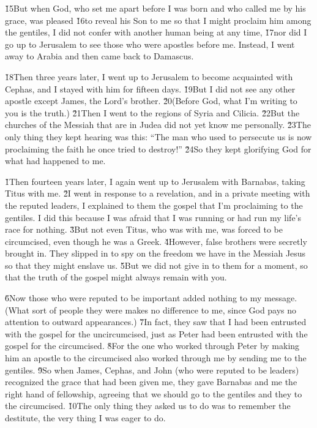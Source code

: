 \v{15}But when God, who set me apart before I was born and who called me by his grace, was pleased \v{16}to reveal his Son to me so that I might proclaim him among the gentiles, I did not confer with another human being at any time, \v{17}nor did I go up to Jerusalem to see those who were apostles before me. Instead, I went away to Arabia and then came back to Damascus.

\v{18}Then three years later, I went up to Jerusalem to become acquainted with Cephas, and I stayed with him for fifteen days. \v{19}But I did not see any other apostle except James, the Lord's brother. \v{20}(Before God, what I'm writing to you is the truth.) \v{21}Then I went to the regions of Syria and Cilicia. \v{22}But the churches of the Messiah that are in Judea did not yet know me personally. \v{23}The only thing they kept hearing was this: ``The man who used to persecute us is now proclaiming the faith he once tried to destroy!'' \v{24}So they kept glorifying God for what had happened to me.

\v{1}Then fourteen years later, I again went up to Jerusalem with Barnabas, taking Titus with me. \v{2}I went in response to a revelation, and in a private meeting with the reputed leaders, I explained to them the gospel that I'm proclaiming to the gentiles. I did this because I was afraid that I was running or had run my life's race for nothing. \v{3}But not even Titus, who was with me, was forced to be circumcised, even though he was a Greek. \v{4}However, false brothers were secretly brought in. They slipped in to spy on the freedom we have in the Messiah Jesus so that they might enslave us. \v{5}But we did not give in to them for a moment, so that the truth of the gospel might always remain with you.

\v{6}Now those who were reputed to be important added nothing to my message. (What sort of people they were makes no difference to me, since God pays no attention to outward appearances.) \v{7}In fact, they saw that I had been entrusted with the gospel for the uncircumcised, just as Peter had been entrusted with the gospel for the circumcised. \v{8}For the one who worked through Peter by making him an apostle to the circumcised also worked through me by sending me to the gentiles. \v{9}So when James, Cephas, and John (who were reputed to be leaders) recognized the grace that had been given me, they gave Barnabas and me the right hand of fellowship, agreeing that we should go to the gentiles and they to the circumcised. \v{10}The only thing they asked us to do was to remember the destitute, the very thing I was eager to do.

